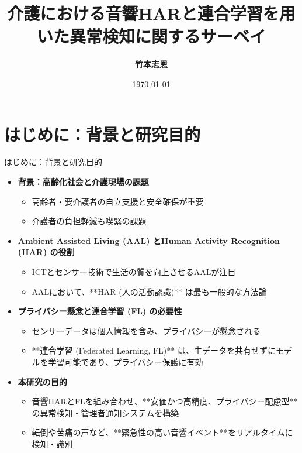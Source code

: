 \documentclass[unicode,12pt,aspectratio=169,dvipdfmx]{beamer}
\title{\textbf{介護における音響HARと連合学習を用いた異常検知に関するサーベイ}}
\author{\textbf{竹本志恩}}
\institute{\textbf{INIAD}}
\date{\today}
\begin{document}
\begin{frame}
\titlepage
\end{frame}

\section{はじめに：背景と研究目的}
\begin{frame}{はじめに：背景と研究目的}
\begin{itemize}
    \item \textbf{背景：高齢化社会と介護現場の課題}
    \begin{itemize}
        \item 高齢者・要介護者の自立支援と安全確保が重要
        \item 介護者の負担軽減も喫緊の課題
    \end{itemize}
    \item \textbf{Ambient Assisted Living (AAL) とHuman Activity Recognition (HAR) の役割}
    \begin{itemize}
        \item ICTとセンサー技術で生活の質を向上させるAALが注目
        \item AALにおいて、**HAR (人の活動認識)** は最も一般的な方法論
    \end{itemize}
    \item \textbf{プライバシー懸念と連合学習 (FL) の必要性}
    \begin{itemize}
        \item センサーデータは個人情報を含み、プライバシーが懸念される
        \item **連合学習 (Federated Learning, FL)** は、生データを共有せずにモデルを学習可能であり、プライバシー保護に有効
    \end{itemize}
    \item \textbf{本研究の目的}
    \begin{itemize}
        \item 音響HARとFLを組み合わせ、**安価かつ高精度、プライバシー配慮型**の異常検知・管理者通知システムを構築
        \item 転倒や苦痛の声など、**緊急性の高い音響イベント**をリアルタイムに検知・識別
    \end{itemize}
\end{itemize}
\end{frame}
\end{document}
